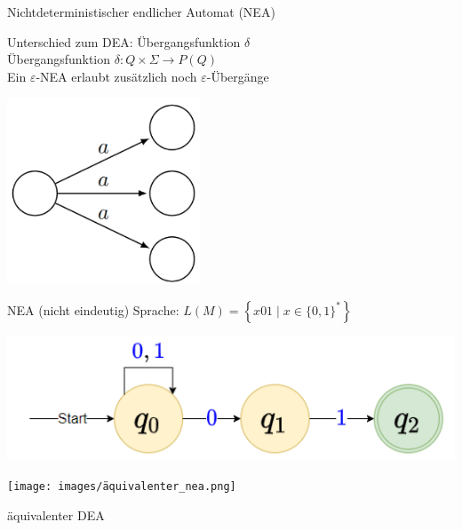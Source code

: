 \begin{definition}{Nichtdeterministischer endlicher Automat (NEA)}\\
    \begin{minipage}{0.75\linewidth}
        Unterschied zum DEA: Übergangsfunktion $\delta$\\
        Übergangsfunktion $\delta: Q \times \Sigma \rightarrow P(Q)$\\
        Ein $\varepsilon$-NEA erlaubt zusätzlich noch $\varepsilon$-Übergänge
    \end{minipage}  
    \begin{minipage}{0.2\linewidth}
        \includegraphics[width=1\linewidth]{images/ndea.png}
    \end{minipage}
\end{definition}

\begin{example2}{NEA (nicht eindeutig)} Sprache: $L(M)=\left\{x 01 \mid x \in\{0,1\}^{*}\right\}$
    
    \begin{minipage}{0.55\linewidth}
        \includegraphics[width=1\linewidth]{images/nea_example1.png}
    \end{minipage}
    \hspace{1mm}
    \begin{minipage}{0.4\linewidth}
        \texttt{[image: images/äquivalenter\_nea.png]}
        
        äquivalenter DEA
    \end{minipage}    
\end{example2}

